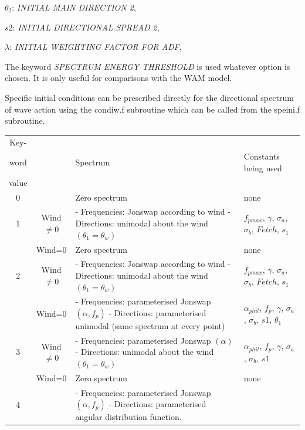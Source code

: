  $\theta_2$:  \textit{INITIAL MAIN DIRECTION 2},

 $s2$:  \textit{INITIAL DIRECTIONAL SPREAD 2},

 $\lambda$:  \textit{INITIAL WEIGHTING FACTOR FOR ADF},


 The keyword \textit{SPECTRUM ENERGY THRESHOLD} is used whatever option is chosen. It is only useful for comparisons with
 the WAM model.

 Specific initial conditions can be prescribed directly for the directional spectrum of wave action using the condiw.f
 subroutine which can be called from the speini.f subroutine.

\begin{table}
\begin{tabular}{|c|c|p{2.2in}|p{1.8in}|} \hline
Key- &  &  &  \\ 
word  &  & Spectrum & Constants  being used \\ 
 value &  & &  \\ \hline
0 &  & Zero spectrum & none \\ \hline
1 & Wind$\ne 0$ & - Frequencies: Jonswap according to wind  \newline - Directions: unimodal about the wind $(\theta_1 = \theta_w)$&
$f_{pmax}$, $ \gamma $, $ \sigma_a$, $ \sigma_b$, $Fetch$, $ s_1 $  \\ \hline
 & Wind=0 & Zero spectrum & none \\ \hline
2 & Wind$\ne 0$ & - Frequencies: Jonswap according to wind \newline - Directions: unimodal about the wind $(\theta_1 = \theta_w)$ &
$f_{pmax}$, $ \gamma $, $ \sigma_a$, $ \sigma_b$, $Fetch$, $ s_1 $ \\ \hline
& Wind=0 & - Frequencies: parameterised Jonswap $(\alpha , f_p)$ \newline - Directions: parameterised unimodal
(same spectrum at every point) & $\alpha_{phil}$, $ f_p$, $ \gamma $, $ \sigma_a$, $ \sigma_b$, $ s1$, $ \theta_1$ \\ \hline
3 & Wind$\ne0$ & - Frequencies: parameterised Jonswap $(\alpha)$ \newline - Directions: unimodal about the wind $(\theta_1 = \theta_w)$ &
$\alpha_{phil}$, $ f_p$, $ \gamma $, $ \sigma_a$, $ \sigma_b$, $ s1$ \\ \hline
 & Wind=0 & Zero spectrum & none \\ \hline
4 &  & - Frequencies: parameterised Jonswap $(\alpha , f_p)$  \newline  - Directions: parameterised angular distribution function.

\end{tabular}
\end{table}
